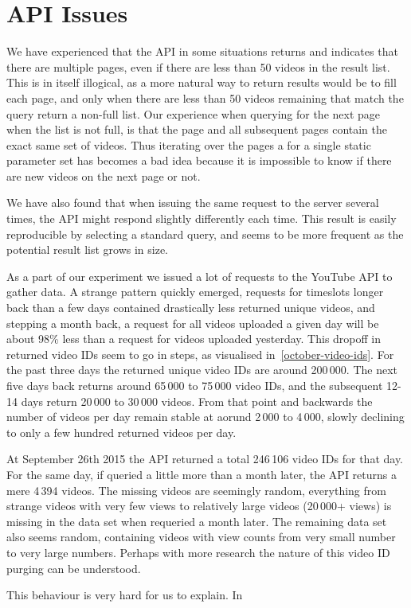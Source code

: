 \section{API Issues}
We have experienced that the API in some situations returns and indicates that
there are multiple pages, even if there are less than 50 videos in the result
list. This is in itself illogical, as a more natural way to return results would
be to fill each page, and only when there are less than 50 videos remaining that
match the query return a non-full list. Our experience when querying for the next
page when the list is not full, is that the page and all subsequent pages contain
the exact same set of videos. Thus iterating over the pages a  for a single
static parameter set has becomes a bad idea because it is impossible to know if
there are new videos on the next page or not.  %

We have also found that when issuing the same request to the server several
times, the API might respond slightly differently each time. This result is
easily reproducible by selecting a standard query, and seems to be more
frequent as the potential result list grows in size.

As a part of our experiment we issued a lot of requests to the YouTube API to
gather data. A strange pattern quickly emerged, requests for timeslots longer
back than a few days contained drastically less returned unique videos, and 
stepping a month back, a request for all videos uploaded a given day will be 
about 98\% less than a request for videos uploaded yesterday. This dropoff in
returned video IDs seem to go in steps, as visualised
in~\cref{october-video-ids}. For the past three days the returned unique video
IDs are around 200\,000. The next five days back returns around 65\,000 to 75\,000
video IDs, and the subsequent 12-14 days return 20\,000 to 30\,000 videos. From
that point and backwards the number of videos per day remain stable at aorund
2\,000 to 4\,000, slowly declining to only a few hundred returned videos per day.

At September 26th 2015 the API returned a total 246\,106 video IDs for that day.
For the same day, if queried a little more than a month later, the API returns
a mere 4\,394 videos. The missing videos are seemingly random, everything from 
strange videos with very few views to relatively large videos (20\,000+ views)
is missing in the data set when requeried a month later. The remaining data set
also seems random, containing videos with view counts from very small number to
very large numbers. Perhaps with more research the nature of this video ID
purging can be understood.

This behaviour is very hard for us to explain. In 


